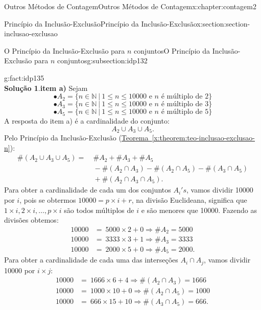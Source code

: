 \documentclass[oneside,10pt,]{book}
\newcommand{\blocktitlefont}{\relax}
\newcommand{\xreffont}{\relax}
\newcommand{\terminology}[1]{\textbf{#1}}
\numberwithin{equation}{section}
\newcommand{\amp}{&}
\begin{document}
\begin{chapterptx}{Outros Métodos de Contagem}{}{Outros Métodos de Contagem}{}{}{x:chapter:contagem2}
\begin{sectionptx}{Princípio da Inclusão-Exclusão}{}{Princípio da Inclusão-Exclusão}{}{}{x:section:section-inclusao-exclusao}
\begin{subsectionptx}{O Princípio da Inclusão-Exclusão para \(n\) conjuntos}{}{O Princípio da Inclusão-Exclusão para \(n\) conjuntos}{}{}{g:subsection:idp132}
\begin{fact}{}{}{g:fact:idp135}
\begin{equation*}
\end{equation*}
%
\textbf{\blocktitlefont Solução 1}.\quad{}\terminology{item a)} Sejam%
\begin{equation*}
\bullet A_2=\{n\in\mathbb{N}~|~ 1\leq n\leq 10000 \text{ e } n \text{ é múltiplo de 2}\}
\end{equation*}
%
\begin{equation*}
\bullet A_3=\{n\in\mathbb{N}~|~ 1\leq n\leq 10000 \text{ e } n \text{ é múltiplo de 3}\}
\end{equation*}
%
\begin{equation*}
\bullet A_5=\{n\in\mathbb{N}~|~ 1\leq n\leq 10000 \text{ e } n \text{ é múltiplo de 5}\}
\end{equation*}
A resposta do item a) é a cardinalidade do conjunto:%
\begin{equation*}
A_2\cup A_3\cup A_5. 
\end{equation*}
Pelo Princípio da Inclusão-Exclusão (\hyperref[x:theorem:teo-inclusao-exclusao-n]{Teorema~{\xreffont\ref{x:theorem:teo-inclusao-exclusao-n}}}):%
\begin{align*}
\#(A_2\cup A_3\cup A_5) = \amp ~  \#A_2+\#A_3+\#A_5 \\
\amp ~ - \#(A_2\cap A_3) - \#(A_2\cap A_5) - \#(A_3\cap A_5) \\
\amp ~ +\#(A_2\cap A_3\cap A_5). 
\end{align*}
Para obter a cardinalidade de cada um dos conjuntos \(A_i's\), vamos dividir 10000 por \(i\), pois se obtermos \(10000 = p\times i + r\), na divisão Euclideana, significa que \(1\times i, 2\times i, \ldots, p\times i \) são todos múltiplos de \(i\) e são menores que 10000. Fazendo as divisões obtemos:%
\begin{align*}
10000 \amp =  ~ 5000\times 2 + 0 \Rightarrow \#A_2 = 5000 \\
10000 \amp =  ~ 3333\times 3 + 1 \Rightarrow \#A_3 = 3333 \\
10000 \amp =  ~ 2000\times 5 + 0 \Rightarrow \#A_5 = 2000. 
\end{align*}
Para obter a cardinalidade de cada uma das interseções \(A_i\cap A_j\), vamos dividir 10000 por \(i\times j\):%
\begin{align*}
10000 \amp =  ~ 1666\times 6 + 4 \Rightarrow \#(A_2\cap A_3) = 1666 \\
10000 \amp =  ~ 1000\times 10 + 0 \Rightarrow \#(A_2\cap A_5) = 1000 \\
10000 \amp =  ~ 666\times 15 + 10 \Rightarrow \#(A_3\cap A_5) = 666. 
\end{align*}

\end{fact}
\end{subsectionptx}
\end{sectionptx}
\end{chapterptx}
\end{document}
